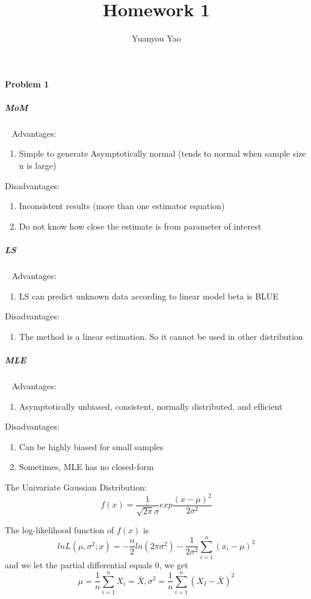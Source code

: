 \documentclass{article}
\title{Homework 1}
\author{Yuanyou Yao}
\begin{document}
\maketitle{}
\paragraph{Problem 1}
\subparagraph{MoM}~{}
\newline
Advantages:
\begin{enumerate}
\item Simple to generate Asymptotically normal (tends to normal when sample size n is large) 
\end{enumerate}
Disadvantages:
\begin{enumerate}
\item Inconsistent results (more than one estimator equation) 
\item Do not know how close the estimate is from parameter of interest
\end{enumerate}
\subparagraph{LS}~{}
\newline
Advantages:
\begin{enumerate}
\item LS can predict unknown data according to linear model beta is BLUE
\end{enumerate}
Disadvantages:
\begin{enumerate}
\item The method is a linear estimation. So it cannot be used in other distribution
\end{enumerate}
\subparagraph{MLE}~{}
\newline
Advantages:
\begin{enumerate}
\item Asymptotically unbiased, consistent, normally distributed, and efﬁcient 
\end{enumerate}
Disadvantages: 
\begin{enumerate}
\item Can be highly biased for small samples
\item Sometimes, MLE has no closed-form
\end{enumerate}

The Univariate Gaussian Distribution:\[f(x)=\frac{1}{\sqrt{2\pi}\sigma}exp\frac{(x-\mu)^2}{2\sigma^2}\]

The  log-likelihood function of $f(x)$ is \[lnL(\mu,\sigma^2;x)=-\frac{n}{2}ln(2\pi \sigma^2)-\frac{1}{2\sigma^2}\sum_{i=1}^n(x_i-\mu)^2\]
and we let the partial differential equals 0, we get\[\mu=\frac{1}{n}\sum_{i=1}^nX_i=\bar{X}, \sigma^2=\frac{1}{n}\sum_{i=1}^n(X_I-\bar{X})^2\]
\end{document}
